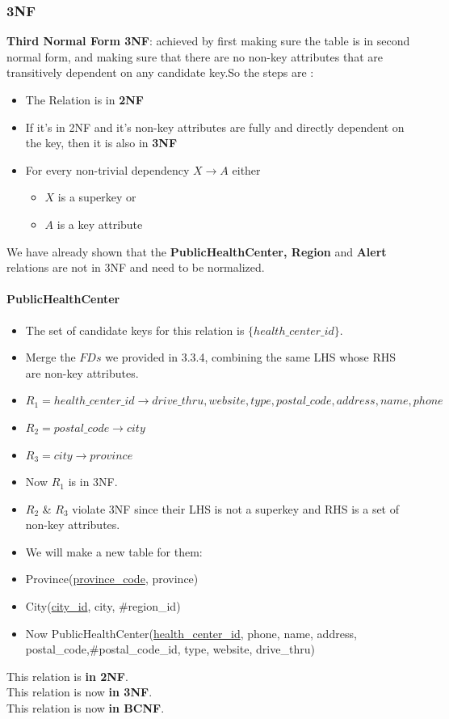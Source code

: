 \documentclass{article}
\begin{document}
\subsubsection{3NF}
\begin{tcolorbox}
    \textbf{Third Normal Form 3NF}: achieved by first making sure the table is in second normal form, and making sure that there are no non-key attributes that are transitively dependent on any candidate key.So the steps are :
    \begin{itemize}
        \item The Relation is in \textbf{2NF}
        \item If it's in 2NF and it's non-key attributes are fully and directly dependent on the key, then it is also in \textbf{3NF}
        \item For every non-trivial dependency $X\rightarrow A$ either
        \begin{itemize}
            \item $X$ is a superkey or 
            \item $A$ is a key attribute
        \end{itemize}
    \end{itemize}
\end{tcolorbox}
We have already shown that the \textbf{PublicHealthCenter, Region} and \textbf{Alert} relations are not in 3NF and need to be normalized.
\paragraph{PublicHealthCenter}
\begin{itemize}
    \item The set of candidate keys for this relation is $\{health\_center\_id\}$.
    \item Merge the $FDs$ we provided in 3.3.4, combining the same LHS whose RHS are non-key attributes.
    \item $R_1 = health\_center\_id \rightarrow drive\_thru, website, type, postal\_code, address, name, phone$
    \item $R_2 = postal\_code \rightarrow city$
    \item $R_3 = city \rightarrow province$
    \item Now $R_1$ is in 3NF.
    \item $R_2$ \& $R_3$ violate 3NF since their LHS is not a superkey and RHS is a set of non-key attributes.
    \item We will make a new table for them:
    \item Province(\underline{province\_code}, province)
    \item City(\underline{city\_id}, city, \#region\_id)
    \item Now PublicHealthCenter(\underline{health\_center\_id}, phone, name, address, postal\_code,\#postal\_code\_id, type, website, drive\_thru)
\end{itemize}
This relation is \textbf{in 2NF}.\\
This relation is now \textbf{in 3NF}.\\
This relation is now \textbf{in BCNF}.
\end{document}
